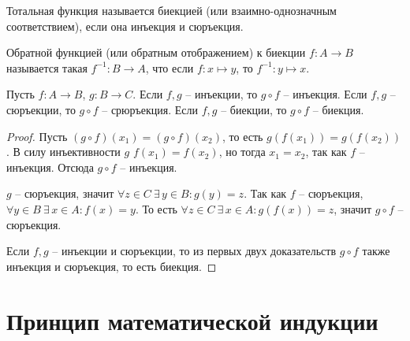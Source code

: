 \documentclass[12pt]{article}
\begin{document}
\begin{definition}
	Тотальная функция называется биекцией (или взаимно-однозначным
	соответствием), если она инъекция и сюръекция.
\end{definition}
\begin{definition}
	Обратной функцией (или обратным отображением) к биекции $f\colon
	A\to B$ называется такая $f^{-1}\colon B\to A$, что если $f\colon
	x\mapsto y$, то $f^{-1}\colon y \mapsto x$.
\end{definition}
\begin{lemma}
	Пусть $f\colon A\to B$, $g\colon B\to C$. Если $f, g$ -- инъекции,
	то $g\circ f$ -- инъекция. Если $f, g$ -- сюръекции, то $g\circ f$
	-- срюръекция. Если $f, g$ -- биекции, то $g\circ f$ -- биекция.
	\begin{proof}
		Пусть $(g\circ f)(x_1)=(g\circ f)(x_2)$, то есть
		$g(f(x_1))=g(f(x_2))$. В силу инъективности $g$ $f(x_1)=f(x_2)$, но
		тогда $x_1=x_2$, так как $f$ -- инъекция. Отсюда $g\circ f$ --
		инъекция.\par

		$g$ -- сюръекция, значит $\forall z\in C\ \exists\,y\in B\colon
		g(y)=z$. Так как $f$ -- сюръекция, $\forall y\in B\ \exists\,x\in
		A\colon f(x)=y$. То есть $\forall z\in C\ \exists\,x\in A\colon
		g(f(x))=z$, значит $g\circ f$ -- сюръекция.\par

		Если $f, g$ -- инъекции и сюръекции, то из первых двух
		доказательств $g\circ f$ также инъекция и сюръекция, то есть биекция.
	\end{proof}
\end{lemma}

\section{Принцип математической индукции}
\end{document}
